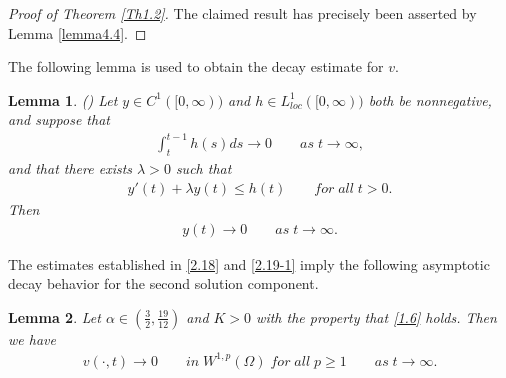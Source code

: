 \documentclass[12pt]{article}
\theoremstyle{plain}
\newtheorem{lemma}{Lemma}[section]
\theoremstyle{definition}
\numberwithin{equation}{section}
\begin{document}
\begin{proof}[Proof of Theorem \ref{Th1.2}] The claimed result has precisely been asserted by Lemma \ref{lemma4.4}.
\end{proof}
The following lemma is used to obtain the decay estimate for $v$.
\begin{lemma}\label{lemma4.0}(\cite{TaoW3})
    Let $y\in C^1([0,\infty))$ and $h\in L^1_{loc}([0,\infty))$ both be nonnegative, and suppose that
    \begin{align*}
        \int_t^{t-1}h(s)ds\rightarrow 0\qquad as\; t\rightarrow\infty,
    \end{align*}
    and that there exists $\lambda>0$ such that
    \begin{align*}
        y'(t)+\lambda y(t)\leq h(t) \qquad for \;all\;t>0.
    \end{align*}
    Then
    \begin{align*}
        y(t)\rightarrow 0\qquad as\; t\rightarrow\infty.
    \end{align*}
\end{lemma}
The estimates established in \eqref{2.18} and \eqref{2.19-1}  imply the following asymptotic decay behavior for the second solution component.
\begin{lemma}\label{lemma4.5}
Let $\alpha\in\left(\frac{3}{2},\frac{19}{12}\right)$ and $K>0$ with the property that \eqref{1.6} holds.  Then  we have
\begin{align}\label{4.8}
    v(\cdot,t)\rightarrow 0\qquad in\;W^{1,p}(\Omega)\;for\;all\;p\geq 1\qquad as\; t\to \infty.
\end{align}
\end{lemma}
\end{document}
